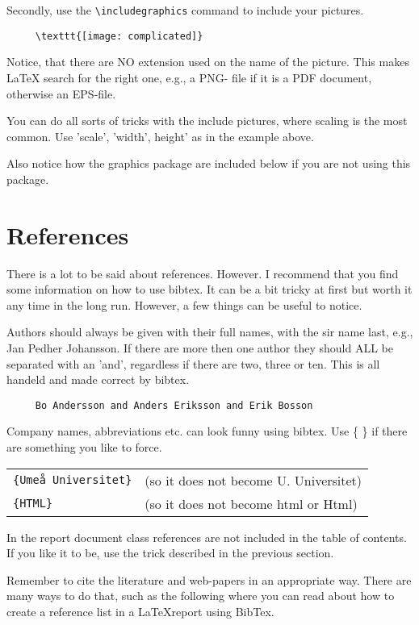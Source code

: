 \documentclass[a4paper,11pt,twoside]{report}
\begin{document}
Secondly, use the \verb+\includegraphics+ command to include your 
pictures. 

\begin{verbatim}
     \texttt{[image: complicated]}
\end{verbatim}

Notice, that there are NO extension used on the name of the
picture. This makes {\LaTeX} search for the right one, e.g., a PNG-
file if it is a PDF document, otherwise an EPS-file.

You can do all sorts of tricks with the include pictures, where
scaling is the most common. Use 'scale', 'width', height' as in the
example above.

Also notice how the graphics package are included below if you are
not using this package.

\section{References}

There is a lot to be said about references. However. I recommend
that you find some information on how to use bibtex. It can be a bit
tricky at first but worth it any time in the long run. However, a
few things can be useful to notice.

Authors should always be given with their full names, with the sir
name last, e.g., Jan Pedher Johansson. If there are more then one
author they should ALL be separated with an 'and', regardless if
there are two, three or ten. This is all handeld and made correct
by bibtex. 
\begin{verbatim}
     Bo Andersson and Anders Eriksson and Erik Bosson  
\end{verbatim}

Company names, abbreviations etc. can look funny using bibtex. Use 
\{ \} if there are something you like to force.

\begin{tabular}{ll}
\texttt{\{Umeå Universitet\}} & (so it does not become U. Universitet) \\
\texttt{\{HTML\}} & (so it does not become html or Html)
\end{tabular}

In the report document class references are not included in the
table of contents. If you like it to be, use the trick described in
the previous section.

Remember to cite the literature and web-papers in an appropriate way. 
There are many ways to do that, such as the following \cite{Lamp94} where 
you can read about how to create a reference list in a {\LaTeX}\-report 
using BibTex.
\end{document}
